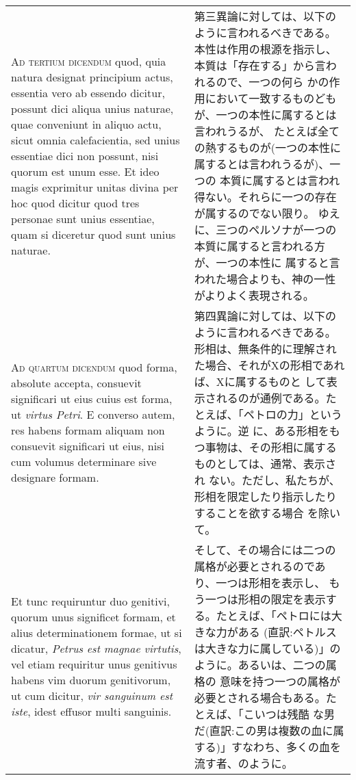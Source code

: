 \documentclass[10pt]{jsarticle} %
\begin{document}
\begin{longtable}{p{21em}p{21em}}
\\



{\scshape Ad tertium dicendum} quod, quia natura designat principium actus,
essentia vero ab essendo dicitur, possunt dici aliqua unius naturae,
quae conveniunt in aliquo actu, sicut omnia calefacientia, sed unius
essentiae dici non possunt, nisi quorum est unum esse. Et ideo magis
exprimitur unitas divina per hoc quod dicitur quod tres personae sunt
unius essentiae, quam si diceretur quod sunt unius naturae.


&

第三異論に対しては、以下のように言われるべきである。
本性は作用の根源を指示し、本質は「存在する」から言われるので、一つの何ら
 かの作用において一致するものどもが、一つの本性に属するとは言われうるが、
 たとえば全ての熱するものが(一つの本性に属するとは言われうるが)、一つの
 本質に属するとは言われ得ない。それらに一つの存在が属するのでない限り。
 ゆえに、三つのペルソナが一つの本質に属すると言われる方が、一つの本性に
 属すると言われた場合よりも、神の一性がよりよく表現される。


\\



{\scshape Ad quartum dicendum} quod forma, absolute accepta, consuevit significari
ut eius cuius est forma, ut {\itshape virtus Petri}. E converso autem, res habens
formam aliquam non consuevit significari ut eius, nisi cum volumus
determinare sive designare formam. 


&


第四異論に対しては、以下のように言われるべきである。
形相は、無条件的に理解された場合、それがXの形相であれば、Xに属するものと
 して表示されるのが通例である。たとえば、「ペトロの力」というように。逆
 に、ある形相をもつ事物は、その形相に属するものとしては、通常、表示され
 ない。ただし、私たちが、形相を限定したり指示したりすることを欲する場合
 を除いて。

\\

Et tunc requiruntur duo genitivi,
quorum unus significet formam, et alius determinationem formae, ut si
dicatur, {\itshape Petrus est magnae virtutis}, vel etiam requiritur unus genitivus
habens vim duorum genitivorum, ut cum dicitur, {\itshape vir sanguinum est iste},
idest effusor multi sanguinis. 


&

そして、その場合には二つの属格が必要とされるのであり、一つは形相を表示し、
 もう一つは形相の限定を表示する。たとえば、「ペトロには大きな力がある
 (直訳:ペトルスは大きな力に属している)」のように。あるいは、二つの属格の
 意味を持つ一つの属格が必要とされる場合もある。たとえば、「こいつは残酷
 な男だ(直訳:この男は複数の血に属する)」すなわち、多くの血を流す者、のように。



\end{longtable}
\end{document}
